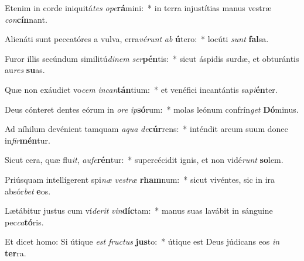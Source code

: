 \item Etenim in corde iniquitá\textit{tes} \textit{o}\textit{pe}\textbf{rá}mini:~* in terra injustítias manus vestræ \textit{con}\textbf{cín}nant.
\item Alienáti sunt peccatóres a vulva, erra\textit{vé}\textit{runt} \textit{ab} \textbf{ú}tero:~* locúti \textit{sunt} \textbf{fal}sa.
\item Furor illis secúndum similitú\textit{di}\textit{nem} \textit{ser}\textbf{pén}tis:~* sicut áspidis surdæ, et obturántis au\textit{res} \textbf{su}as.
\item Quæ non exáudiet vo\textit{cem} \textit{in}\textit{can}\textbf{tán}tium:~* et venéfici incantántis sa\textit{pi}\textbf{én}ter.
\item Deus cónteret dentes eórum in \textit{o}\textit{re} \textit{ip}\textbf{só}rum:~* molas leónum confrín\textit{get} \textbf{Dó}minus.
\item Ad níhilum devénient tamquam \textit{a}\textit{qua} \textit{de}\textbf{cúr}rens:~* inténdit arcum suum donec in\textit{fir}\textbf{mén}tur.
\item Sicut cera, quæ flu\textit{it}, \textit{au}\textit{fe}\textbf{rén}tur:~* supercécidit ignis, et non vidé\textit{runt} \textbf{so}lem.
\item Priúsquam intellígerent spi\textit{næ} \textit{ves}\textit{træ} \textbf{rham}num:~* sicut vivéntes, sic in ira absór\textit{bet} \textbf{e}os.
\item Lætábitur justus cum ví\textit{de}\textit{rit} \textit{vin}\textbf{díc}tam:~* manus suas lavábit in sánguine pec\textit{ca}\textbf{tó}ris.
\item Et dicet homo: Si útique \textit{est} \textit{fruc}\textit{tus} \textbf{jus}to:~* útique est Deus júdicans eos \textit{in} \textbf{ter}ra.
